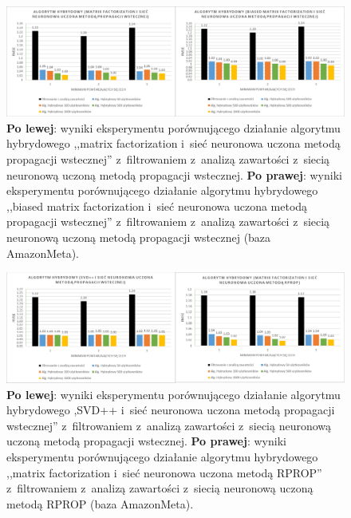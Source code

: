 \documentclass[twoside]{iisthesis}
\begin{document}
			\begin{figure}
			\centering
			\includegraphics[width=1\textwidth]{am_exphybrid1_1}			
			\caption{\textbf{Po lewej}: wyniki eksperymentu porównującego działanie algorytmu hybrydowego ,,matrix factorization i~sieć neuronowa uczona metodą propagacji wstecznej'' z~filtrowaniem z~analizą zawartości z~siecią neuronową uczoną metodą propagacji wstecznej. \textbf{Po prawej}: wyniki eksperymentu porównującego działanie algorytmu hybrydowego ,,biased matrix factorization i~sieć neuronowa uczona metodą propagacji wstecznej'' z~filtrowaniem z~analizą zawartości z~siecią neuronową uczoną metodą propagacji wstecznej (baza AmazonMeta).}
			\label{fig:am_exphybrid1_1}
		\end{figure}
		
		\begin{figure}
			\centering
			\includegraphics[width=1\textwidth]{am_exphybrid1_2}			
			\caption{\textbf{Po lewej}: wyniki eksperymentu porównującego działanie algorytmu hybrydowego ,SVD++ i~sieć neuronowa uczona metodą propagacji wstecznej'' z~filtrowaniem z~analizą zawartości z~siecią neuronową uczoną metodą propagacji wstecznej. \textbf{Po prawej}: wyniki eksperymentu porównującego działanie algorytmu hybrydowego ,,matrix factorization i~sieć neuronowa uczona metodą RPROP'' z~filtrowaniem z~analizą zawartości z~siecią neuronową uczoną metodą RPROP (baza AmazonMeta).}
			\label{fig:am_exphybrid1_2}
		\end{figure}
		
\end{document}
